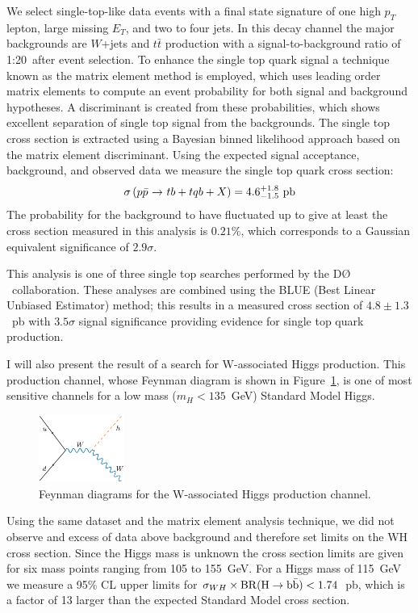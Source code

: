 \documentclass [10pt, twoside] {article}
\newcommand{\ppbar} 	{\mbox{$p\bar{p}$}}
\newcommand{\ttbar} 	{\mbox{$t\bar{t}$}}
\newcommand{\dzero} 	{\mbox{D\O}}
\newcommand{\rargap}    {\mbox{ $\rightarrow$ }}
\begin{document}
We select single-top-like data events with a final state signature of one high $p_{T}$ lepton, large missing $E_{T}$, and two to four jets. In this decay channel the major backgrounds are $W$+jets and $\ttbar$ production with a signal-to-background ratio of 1:20~after event selection. To enhance the single top quark signal a technique known as the matrix element method is employed, which uses leading order matrix elements to compute an event probability for both signal and background hypotheses. A discriminant is created from these probabilities, which shows excellent separation of single top signal from the backgrounds. The single top cross section is extracted using a Bayesian binned likelihood approach based on the matrix element discriminant. Using the expected signal acceptance, background, and observed data we measure the single top quark cross section:
$$
\begin{array}{lll}
\sigma\left({\ppbar}{\rargap}tb+tqb+X\right) = 4.6 ^{+1.8}_{-1.5}~{\rm pb}\\
\end{array}
$$
The probability for the background to have fluctuated up to give at
least the cross section measured in this analysis is
$0.21\%$, which corresponds to a Gaussian equivalent significance of
$2.9\sigma$.

This analysis is one of three single top searches performed by the $\dzero$~collaboration. These analyses are combined using the BLUE (Best Linear Unbiased Estimator) method; this results in a measured cross section of $4.8\pm1.3$~pb with $3.5\sigma$ signal significance providing evidence for single top quark production. 

I will also present the result of a search for W-associated Higgs production. This production channel, whose Feynman diagram is shown in Figure~\ref{wh}, is one of most sensitive channels for a low mass ($m_{H}<135$~GeV) Standard Model Higgs. 

\begin{figure}[!h!tbp]
\begin{center}
\includegraphics[width=0.25\textwidth]{eps/Feynman/wh.eps}
\end{center}
\caption{Feynman diagrams for the W-associated Higgs production channel.}
\label{wh}
\end{figure}

Using the same dataset and the matrix element analysis technique, we did not observe and excess of data above background and therefore set limits on the WH cross section. Since the Higgs mass is unknown the cross section limits are given for six mass points ranging from 105 to 155~GeV. For a Higgs mass of 115~GeV we measure a 95\% CL upper limits for $\sigma_{WH}\times\rm{BR}(H\rightarrow b\bar{b}) < 1.74$~pb, which is a factor of 13 larger than the expected Standard Model cross section.

 
\end{document}
